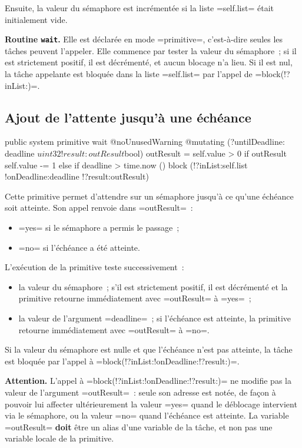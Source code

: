 Ensuite, la valeur du sémaphore est incrémentée si la liste \plm=self.list= était initialement vide.


{\bf Routine \texttt{wait}.} Elle est déclarée en mode \plm=primitive=, c'est-à-dire seules les tâches peuvent l'appeler. Elle commence par tester la valeur du sémaphore~; si il est strictement positif, il est décrémenté, et aucun blocage n'a lieu. Si il est nul, la tâche appelante est bloquée dans la liste \plm=self.list= par l'appel de \plm=block(!?inList:)=.


\subsection{Ajout de l'attente jusqu'à une échéance}

\begin{PLM}
public system primitive wait
@noUnusedWarning @mutating (?untilDeadline: deadline $uint32
                            !result: outResult $bool) {
  outResult = self.value > 0
  if outResult {
    self.value -= 1
  }else if deadline > time.now () { 
    block (!?inList:self.list !onDeadline:deadline !?result:outResult)
  }
}
\end{PLM}

Cette primitive permet d'attendre sur un sémaphore jusqu'à ce qu'une échéance soit atteinte. Son appel renvoie dans \plm=outResult=~:
\begin{itemize}
  \item \plm=yes= si le sémaphore a permis le passage~;
  \item \plm=no= si l'échéance a été atteinte.
\end{itemize}

L'exécution de la primitive teste successivement~:
\begin{itemize}
  \item la valeur du sémaphore~; s'il est strictement positif, il est décrémenté et la primitive retourne immédiatement avec \plm=outResult= à \plm=yes=~;
  \item la valeur de l'argument \plm=deadline=~; si l'échéance est atteinte, la primitive retourne immédiatement avec \plm=outResult= à \plm=no=.
\end{itemize}

Si la valeur du sémaphore est nulle et que l'échéance n'est pas atteinte, la tâche est bloquée par l'appel à \plm=block(!?inList:!onDeadline:!?result:)=.

{\bf Attention.} L'appel à \plm=block(!?inList:!onDeadline:!?result:)= ne modifie pas la valeur de l'argument \plm=outResult=~: seule son adresse est notée, de façon à pouvoir lui affecter ultérieurement la valeur \plm=yes= quand le déblocage intervient via le sémaphore, ou la valeur \plm=no= quand l'échéance est atteinte. La variable \plm=outResult= {\bf doit} être un alias d'une variable de la tâche, et non pas une variable locale de la primitive.




